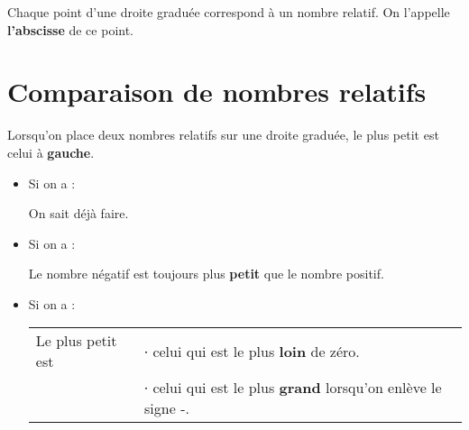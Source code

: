 \documentclass[a4paper,11pt]{article}
\begin{document}
\newpage

\begin{cours}
	Chaque point d'une droite graduée correspond à un nombre relatif. On l'appelle \textbf{l'abscisse} de ce point.
\end{cours}

\section{Comparaison de nombres relatifs}

\begin{cours}
	Lorsqu'on place deux nombres relatifs sur une droite graduée, le plus petit est celui à \textbf{gauche}.
\end{cours}

\begin{exemple}
	 \hspace{2em}
\end{exemple}

\begin{methode}
	\begin{itemize}
		\item Si on a  :

		      On sait déjà faire.
		\item Si on a  :

		      Le nombre négatif est toujours plus \textbf{petit} que le nombre positif.
		\item Si on a  :

		      \begin{tabular}{ll}
			      Le plus petit est & ∙ celui qui est le plus \textbf{loin} de zéro.                      \\
			                        & ∙ celui qui est le plus \textbf{grand} lorsqu'on enlève le signe -.
		      \end{tabular}
	\end{itemize}
\end{methode}
\end{document}
